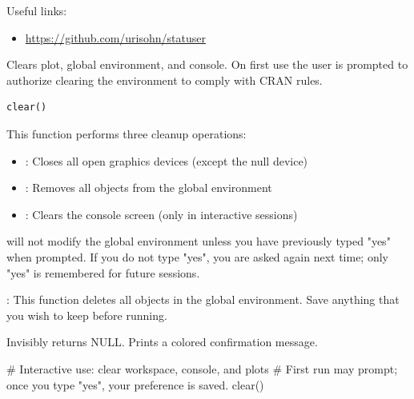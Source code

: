 \documentclass[a4paper]{book}
\begin{document}
%
\begin{SeeAlso}
Useful links:
\begin{itemize}

\item{} \url{https://github.com/urisohn/statuser}

\end{itemize}

\end{SeeAlso}
%
\begin{Description}
Clears plot, global environment, and console. On first use the user is
prompted to authorize clearing the environment to comply with CRAN rules.
\end{Description}
%
\begin{Usage}
\begin{verbatim}
clear()
\end{verbatim}
\end{Usage}
%
\begin{Details}
This function performs three cleanup operations:
\begin{itemize}

\item{} : Closes all open graphics devices (except the null device)
\item{} : Removes all objects from the global environment
\item{} : Clears the console screen (only in interactive sessions)

\end{itemize}


 will not modify the global environment unless you have
previously typed "yes" when prompted. If you do not type "yes", you are asked
again next time; only "yes" is remembered for future sessions.

: This function deletes all objects in the global environment.
Save anything that you wish to keep before running.
\end{Details}
%
\begin{Value}
Invisibly returns NULL. Prints a colored confirmation message.
\end{Value}
%
\begin{Examples}
\begin{ExampleCode}

# Interactive use: clear workspace, console, and plots
# First run may prompt; once you type "yes", your preference is saved.
clear()


\end{ExampleCode}
\end{Examples}
\end{document}

